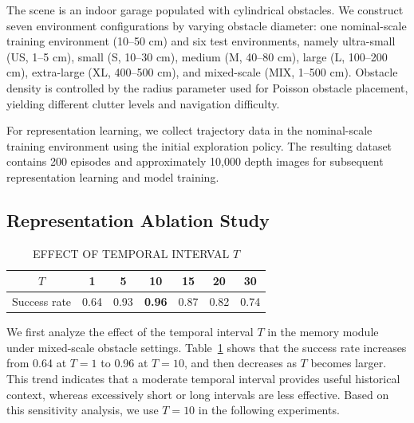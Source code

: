 \documentclass[letterpaper, 10 pt, conference]{ieeeconf}  %
\begin{document}
The scene is an indoor garage populated with cylindrical obstacles. We construct seven environment configurations by varying obstacle diameter: 
one nominal-scale training environment (10--50 cm) and six test environments, namely ultra-small (US, 1--5 cm), small (S, 10--30 cm), medium (M, 40--80 cm), large (L, 100--200 cm), extra-large (XL, 400--500 cm), 
and mixed-scale (MIX, 1--500 cm). Obstacle density is controlled by the radius parameter used for Poisson obstacle placement, yielding different clutter levels and navigation difficulty.

For representation learning, we collect trajectory data in the nominal-scale training environment using the initial exploration policy. 
The resulting dataset contains 200 episodes and approximately 10,000 depth images for subsequent representation learning and model training.

\subsection{Representation Ablation Study}

\begin{table}[t]
  \centering
  \caption{EFFECT OF TEMPORAL INTERVAL $T$}
  \label{tab:t_sensitivity}
  \small
  \setlength{\tabcolsep}{4pt}
  \renewcommand{\arraystretch}{1.05}
  \begin{tabular}{c cccccc}
    \toprule
    $T$ & 1 & 5 & 10 & 15 & 20 & 30 \\
    \midrule
    Success rate & 0.64 & 0.93 & \textbf{0.96} & 0.87 & 0.82 & 0.74 \\
    \bottomrule
  \end{tabular}
\end{table}

We first analyze the effect of the temporal interval $T$ in the memory module under mixed-scale obstacle settings. 
Table~\ref{tab:t_sensitivity} shows that the success rate increases from 0.64 at $T=1$ to 0.96 at $T=10$, and then decreases as $T$ becomes larger. 
This trend indicates that a moderate temporal interval provides useful historical context, whereas excessively short or long intervals are less effective. 
Based on this sensitivity analysis, we use $T=10$ in the following experiments.
\end{document}
